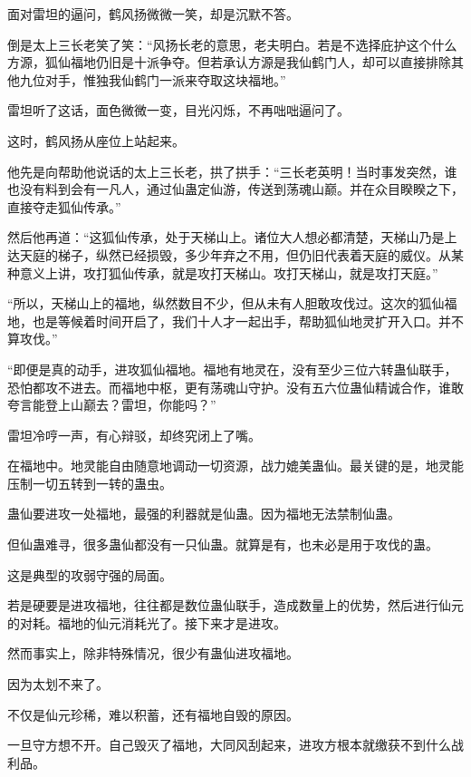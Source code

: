 
\begin{this_body}

面对雷坦的逼问，鹤风扬微微一笑，却是沉默不答。

倒是太上三长老笑了笑：“风扬长老的意思，老夫明白。若是不选择庇护这个什么方源，狐仙福地仍旧是十派争夺。但若承认方源是我仙鹤门人，却可以直接排除其他九位对手，惟独我仙鹤门一派来夺取这块福地。”

雷坦听了这话，面色微微一变，目光闪烁，不再咄咄逼问了。

这时，鹤风扬从座位上站起来。

他先是向帮助他说话的太上三长老，拱了拱手：“三长老英明！当时事发突然，谁也没有料到会有一凡人，通过仙蛊定仙游，传送到荡魂山巅。并在众目睽睽之下，直接夺走狐仙传承。”

然后他再道：“这狐仙传承，处于天梯山上。诸位大人想必都清楚，天梯山乃是上达天庭的梯子，纵然已经损毁，多少年弃之不用，但仍旧代表着天庭的威仪。从某种意义上讲，攻打狐仙传承，就是攻打天梯山。攻打天梯山，就是攻打天庭。”

“所以，天梯山上的福地，纵然数目不少，但从未有人胆敢攻伐过。这次的狐仙福地，也是等候着时间开启了，我们十人才一起出手，帮助狐仙地灵扩开入口。并不算攻伐。”

“即便是真的动手，进攻狐仙福地。福地有地灵在，没有至少三位六转蛊仙联手，恐怕都攻不进去。而福地中枢，更有荡魂山守护。没有五六位蛊仙精诚合作，谁敢夸言能登上山巅去？雷坦，你能吗？”

雷坦冷哼一声，有心辩驳，却终究闭上了嘴。

在福地中。地灵能自由随意地调动一切资源，战力媲美蛊仙。最关键的是，地灵能压制一切五转到一转的蛊虫。

蛊仙要进攻一处福地，最强的利器就是仙蛊。因为福地无法禁制仙蛊。

但仙蛊难寻，很多蛊仙都没有一只仙蛊。就算是有，也未必是用于攻伐的蛊。

这是典型的攻弱守强的局面。

若是硬要是进攻福地，往往都是数位蛊仙联手，造成数量上的优势，然后进行仙元的对耗。福地的仙元消耗光了。接下来才是进攻。

然而事实上，除非特殊情况，很少有蛊仙进攻福地。

因为太划不来了。

不仅是仙元珍稀，难以积蓄，还有福地自毁的原因。

一旦守方想不开。自己毁灭了福地，大同风刮起来，进攻方根本就缴获不到什么战利品。


\end{this_body}
